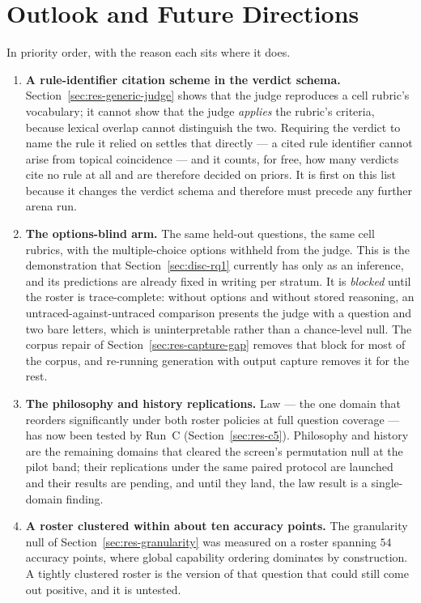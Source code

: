 \section{Outlook and Future Directions}\label{sec:disc-future}

In priority order, with the reason each sits where it does.

\begin{enumerate}

\item \textbf{A rule-identifier citation scheme in the verdict schema.}
Section~\ref{sec:res-generic-judge} shows that the judge reproduces a
cell rubric's vocabulary; it cannot show that the judge \emph{applies}
the rubric's criteria, because lexical overlap cannot distinguish the
two. Requiring the verdict to name the rule it relied on settles that
directly --- a cited rule identifier cannot arise from topical
coincidence --- and it counts, for free, how many verdicts cite no rule
at all and are therefore decided on priors. It is first on this list
because it changes the verdict schema and therefore must precede any
further arena run.

\item \textbf{The options-blind arm.} The same held-out questions, the
same cell rubrics, with the multiple-choice options withheld from the
judge. This is the demonstration that Section~\ref{sec:disc-rq1}
currently has only as an inference, and its predictions are already
fixed in writing per stratum. It is \emph{blocked} until the roster is
trace-complete: without options and without stored reasoning, an
untraced-against-untraced comparison presents the judge with a question
and two bare letters, which is uninterpretable rather than a
chance-level null. The corpus repair of
Section~\ref{sec:res-capture-gap} removes that block for most of the
corpus, and re-running generation with output capture removes it for
the rest.

\item \textbf{The philosophy and history replications.} Law --- the
one domain that reorders significantly under both roster policies at
full question coverage --- has now been tested by Run~C
(Section~\ref{sec:res-c5}). Philosophy and history are the remaining
domains that cleared the screen's permutation null at the pilot band;
their replications under the same paired protocol are launched and
their results are pending, and until they land, the law result is a
single-domain finding.

\item \textbf{A roster clustered within about ten accuracy points.} The
granularity null of Section~\ref{sec:res-granularity} was measured on a
roster spanning $54$ accuracy points, where global capability ordering
dominates by construction. A tightly clustered roster is the version of
that question that could still come out positive, and it is untested.


\end{enumerate}

